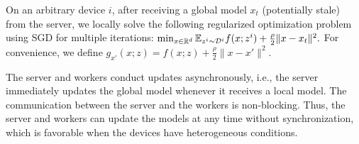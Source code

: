 \documentclass{opt2020} %
\begin{document}
On an arbitrary device $i$, after receiving a global model $x_t$ (potentially stale) from the server, we locally solve the following regularized optimization problem using SGD for multiple iterations:
$
\min_{x \in {\mathbb{R}}^d} {\mathbb{E}}_{z^i \sim \mathcal{D}^i} f(x; z^i) + \frac{\rho}{2} \| x - x_{t} \|^2.
$
For convenience, we define $g_{x'}(x;z) = f(x; z) + \frac{\rho}{2}\|x - x'\|^2$.

\begin{algorithm}[hbt!]
\caption{Asynchronous Federated Optimization (FedAsync)}





\label{alg:fed_async}
\end{algorithm}

The server and workers conduct updates asynchronously, i.e., the server immediately updates the global model whenever it receives a local model. The communication between the server and the workers is non-blocking.
Thus, the server and workers can update the models at any time without synchronization, which is favorable when the devices have heterogeneous conditions.
\end{document}
